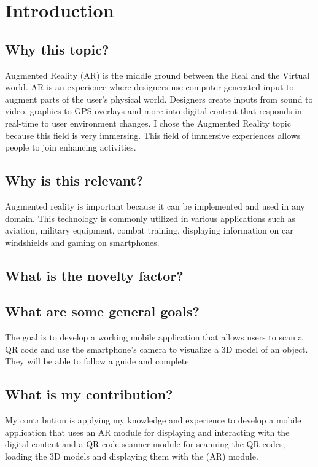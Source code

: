 \chapter{Introduction}\label{cap:introduction}

\section{Why this topic?}
Augmented Reality (AR) is the middle ground between the Real and the Virtual world.
AR is an experience where designers use computer-generated input to augment parts of the user's physical world. Designers create inputs from sound to video, graphics to GPS overlays and more into digital content that responds in real-time to user environment changes.
I chose the Augmented Reality topic because this field is very immersing. This field of immersive experiences allows people to join enhancing activities.

\section{Why is this relevant?}
Augmented reality is important because it can be implemented and used in any domain. This technology is commonly utilized in various applications such as aviation, military equipment, combat training, displaying information on car windshields and gaming on smartphones.

\section{What is the novelty factor?}


\section{What are some general goals?}
The goal is to develop a working mobile application that allows users to scan a QR code and use the smartphone's camera to visualize a 3D model of an object. They will be able to follow a guide and complete

\section{What is my contribution?}
My contribution is applying my knowledge and experience to develop a mobile application that uses an AR module for displaying and interacting with the digital content and a QR code scanner module for scanning the QR codes, loading the 3D models and displaying them with the (AR) module.


